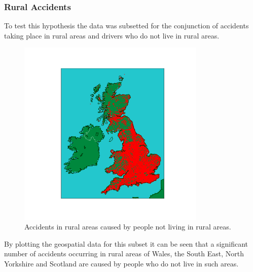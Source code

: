 \documentclass[12pt]{article}
\begin{document}
\subsubsection{Rural Accidents}

To test this hypothesis the data was subsetted for the conjunction of accidents taking place in rural areas and drivers who do not live in rural areas.

\begin{figure}[h]
\centering     %
\includegraphics[width=0.80\textwidth]{rural_accidents}
\caption{Accidents in rural areas caused by people not living in rural areas.}
\end{figure}

By plotting the geospatial data for this subset it can be seen that a significant number of accidents occurring in rural areas of Wales, the South East, North Yorkshire and Scotland are caused by people who do not live in such areas.
\end{document}
